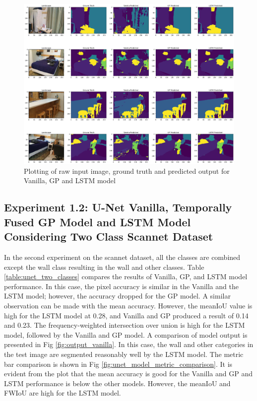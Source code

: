 	\begin{figure}
		\centering
		\includegraphics[width=16cm]{images/unet_scannet_all_classes.png}
		\caption{Plotting of raw input image, ground truth and predicted output for Vanilla, GP and LSTM model}
		\label{fig:unet_model}
	\end{figure}

	\newpage
		
    \subsection{Experiment 1.2: U-Net Vanilla, Temporally Fused GP Model and LSTM Model Considering Two Class Scannet Dataset}
	In the second experiment on the scannet dataset, all the classes are combined except the wall class resulting in the wall and other classes. Table \ref{table:unet_two_classes} compares the results of Vanilla, GP, and LSTM model performance. In this case, the pixel accuracy is similar in the Vanilla and the LSTM model; however, the accuracy dropped for the GP model. A similar observation can be made with the mean accuracy. However, the meanIoU value is high for the LSTM model at 0.28, and Vanilla and GP produced a result of 0.14 and 0.23. The frequency-weighted intersection over union is high for the LSTM model, followed by the Vanilla and GP model. A comparison of model output is presented in Fig \ref{fig:output_vanilla}. In this case, the wall and other categories in the test image are segmented reasonably well by the LSTM model. The metric bar comparison is shown in Fig \ref{fig:unet_model_metric_comparison}. It is evident from the plot that the mean accuracy is good for the Vanilla and GP and LSTM performance is below the other models. However, the meanIoU and FWIoU are high for the LSTM model.

